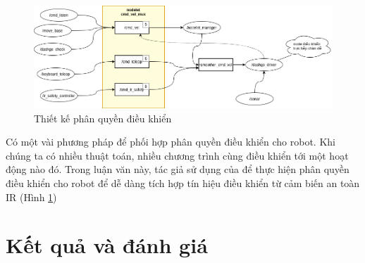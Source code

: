\begin{figure}[htbp]
    \centering
    \includegraphics[width=\linewidth]{figures/phanquen-dexuat.png}
    \caption{Thiết kế phân quyền điều khiển}
    \label{fig:phanquen-dexuat}
\end{figure}

Có một vài phương pháp để phối hợp phân quyền điều khiển cho robot. Khi chúng ta có nhiều thuật toán, nhiều chương trình cùng điều khiển tới một hoạt động nào đó.
Trong luận văn này, tác giả sử dụng  của  để thực hiện phân quyền điều khiển cho robot để dễ dàng tích hợp tín hiệu điều khiển từ cảm biến an toàn IR (Hình \ref{fig:phanquen-dexuat})

\section{Kết quả và đánh giá}
\label{sec:testbed}




